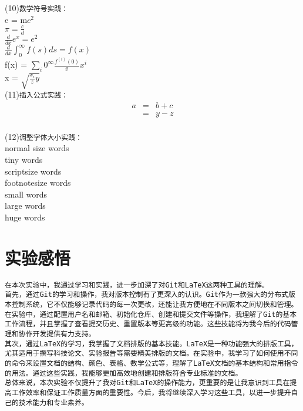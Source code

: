 \documentclass[a4paper, 12pt]{article}
\begin{document}
\noindent(10)\texttt{数学符号实践：}\\
e = m$c^2$\\
$\pi = \frac{c}{d}$\\
$\frac{d}{dx}e^x= e^2$\\
$\frac{d}{dx}\int_0^\infty f(s)ds = f(x)$\\
f(x) = $\sum_i 0^\infty\frac{f^(i)(0)}{i!}x^i$\\
x = $\sqrt{\frac{x_i}{z}y}$\\

\noindent(11)\texttt{插入公式实践：}\\
\begin{eqnarray}
a & = & b + c \\
   & = & y - z \\
\end{eqnarray}

\noindent(12)\texttt{调整字体大小实践：}\\
normal size words\\
{\tiny tiny words}\\
{\scriptsize scriptsize words}\\
{\footnotesize footnotesize words}\\
{\small small words}\\
{\large large words}\\
{\huge huge words}\\

\section{实验感悟}
\noindent \texttt{在本次实验中，我通过学习和实践，进一步加深了对Git和LaTeX这两种工具的理解。}\\
\texttt{首先，通过Git的学习和操作，我对版本控制有了更深入的认识。Git作为一款强大的分布式版本控制系统，它不仅能够记录代码的每一次更改，还能让我方便地在不同版本之间切换和管理。在实验中，通过配置用户名和邮箱、初始化仓库、创建和提交文件等操作，我理解了Git的基本工作流程，并且掌握了查看提交历史、重置版本等更高级的功能。这些技能将为我今后的代码管理和协作开发提供有力支持。}\\
\texttt{其次，通过LaTeX的学习，我掌握了文档排版的基本技能。LaTeX是一种功能强大的排版工具，尤其适用于撰写科技论文、实验报告等需要精美排版的文档。在实验中，我学习了如何使用不同的命令来设置文档的结构、颜色、表格、数学公式等，理解了LaTeX文档的基本结构和常用指令的用法。通过这些实践，我能够更加高效地创建和排版符合专业标准的文档。}\\
\texttt{总体来说，本次实验不仅提升了我对Git和LaTeX的操作能力，更重要的是让我意识到工具在提高工作效率和保证工作质量方面的重要性。今后，我将继续深入学习这些工具，以进一步提升自己的技术能力和专业素养。}\\
\end{document}
